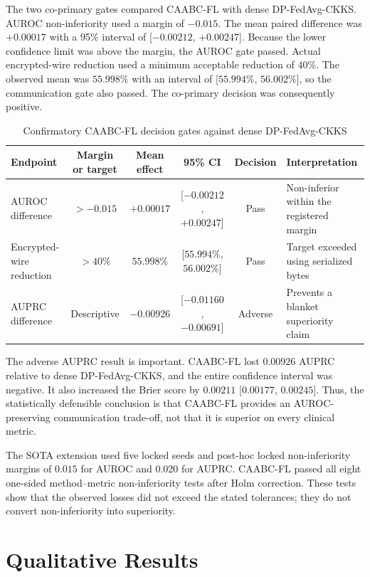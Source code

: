 The two co-primary gates compared CAABC-FL with dense DP-FedAvg-CKKS. AUROC non-inferiority used a margin of $-0.015$. The mean paired difference was $+0.00017$ with a 95\% interval of [$-0.00212$, $+0.00247$]. Because the lower confidence limit was above the margin, the AUROC gate passed. Actual encrypted-wire reduction used a minimum acceptable reduction of $40\%$. The observed mean was $55.998\%$ with an interval of [$55.994\%$, $56.002\%$], so the communication gate also passed. The co-primary decision was consequently positive.

\begin{table}[htbp]
    \centering
    \caption{Confirmatory CAABC-FL decision gates against dense DP-FedAvg-CKKS}
    \label{tab:confirmatory-gates}
    \begin{tabularx}{\textwidth}{@{}lccccX@{}}
        \toprule
        Endpoint & Margin or target & Mean effect & 95\% CI & Decision & Interpretation \\
        \midrule
        AUROC difference & $>-0.015$ & $+0.00017$ & [$-0.00212$, $+0.00247$] & Pass & Non-inferior within the registered margin \\
        Encrypted-wire reduction & $>40\%$ & $55.998\%$ & [$55.994\%$, $56.002\%$] & Pass & Target exceeded using serialized bytes \\
        AUPRC difference & Descriptive & $-0.00926$ & [$-0.01160$, $-0.00691$] & Adverse & Prevents a blanket superiority claim \\
        \bottomrule
    \end{tabularx}
\end{table}

The adverse AUPRC result is important. CAABC-FL lost $0.00926$ AUPRC relative to dense DP-FedAvg-CKKS, and the entire confidence interval was negative. It also increased the Brier score by $0.00211$ [$0.00177$, $0.00245$]. Thus, the statistically defensible conclusion is that CAABC-FL provides an AUROC-preserving communication trade-off, not that it is superior on every clinical metric.

The SOTA extension used five locked seeds and post-hoc locked non-inferiority margins of $0.015$ for AUROC and $0.020$ for AUPRC. CAABC-FL passed all eight one-sided method--metric non-inferiority tests after Holm correction. These tests show that the observed losses did not exceed the stated tolerances; they do not convert non-inferiority into superiority.

\section{Qualitative Results}
\label{sec:qualitative-results}

